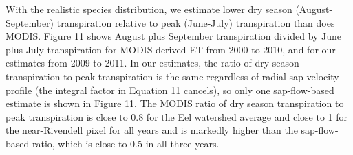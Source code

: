 With the realistic species distribution, we estimate lower dry season (August-September) transpiration relative to peak (June-July) transpiration than does MODIS.  Figure 11 shows August plus September transpiration divided by June plus July transpiration for MODIS-derived ET from 2000 to 2010, and for our estimates from 2009 to 2011.  In our estimates, the ratio of dry season transpiration to peak transpiration is the same regardless of radial sap velocity profile (the integral factor in Equation 11 cancels), so only one sap-flow-based estimate is shown in Figure 11.  The MODIS ratio of dry season transpiration to peak transpiration is close to 0.8 for the Eel watershed average and close to 1 for the near-Rivendell pixel for all years and is markedly higher than the sap-flow-based ratio, which is close to 0.5 in all three years.

